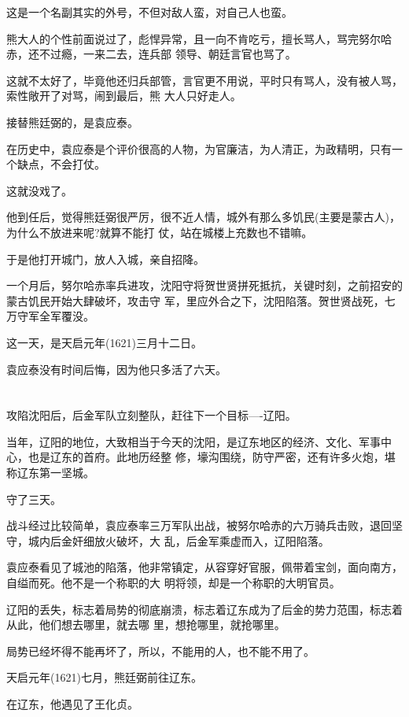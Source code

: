 \documentclass[11pt,a4paper,onecolumn]{article}
\begin{document}
这是一个名副其实的外号，不但对敌人蛮，对自己人也蛮。

熊大人的个性前面说过了，彪悍异常，且一向不肯吃亏，擅长骂人，骂完努尔哈赤，还不过瘾，一来二去，连兵部
领导、朝廷言官也骂了。

这就不太好了，毕竟他还归兵部管，言官更不用说，平时只有骂人，没有被人骂，索性敞开了对骂，闹到最后，熊
大人只好走人。

接替熊廷弼的，是袁应泰。

在历史中，袁应泰是个评价很高的人物，为官廉洁，为人清正，为政精明，只有一个缺点，不会打仗。

这就没戏了。

他到任后，觉得熊廷弼很严厉，很不近人情，城外有那么多饥民(主要是蒙古人)，为什么不放进来呢?就算不能打
仗，站在城楼上充数也不错嘛。

于是他打开城门，放人入城，亲自招降。

一个月后，努尔哈赤率兵进攻，沈阳守将贺世贤拼死抵抗，关键时刻，之前招安的蒙古饥民开始大肆破坏，攻击守
军，里应外合之下，沈阳陷落。贺世贤战死，七万守军全军覆没。

这一天，是天启元年(1621)三月十二日。

袁应泰没有时间后悔，因为他只多活了六天。

\section[\thesection]{}

攻陷沈阳后，后金军队立刻整队，赶往下一个目标----辽阳。

当年，辽阳的地位，大致相当于今天的沈阳，是辽东地区的经济、文化、军事中心，也是辽东的首府。此地历经整
修，壕沟围绕，防守严密，还有许多火炮，堪称辽东第一坚城。

守了三天。

战斗经过比较简单，袁应泰率三万军队出战，被努尔哈赤的六万骑兵击败，退回坚守，城内后金奸细放火破坏，大
乱，后金军乘虚而入，辽阳陷落。

袁应泰看见了城池的陷落，他非常镇定，从容穿好官服，佩带着宝剑，面向南方，自缢而死。他不是一个称职的大
明将领，却是一个称职的大明官员。

辽阳的丢失，标志着局势的彻底崩溃，标志着辽东成为了后金的势力范围，标志着从此，他们想去哪里，就去哪
里，想抢哪里，就抢哪里。

局势已经坏得不能再坏了，所以，不能用的人，也不能不用了。

天启元年(1621)七月，熊廷弼前往辽东。

在辽东，他遇见了王化贞。
\end{document}
